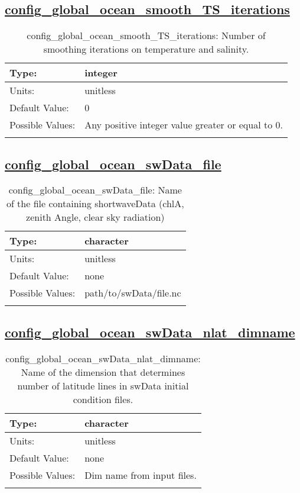 \subsection[config\_global\_ocean\_smooth\_TS\_iterations]{\hyperref[sec:nm_tab_global_ocean]{config\_global\_ocean\_smooth\_TS\_iterations}}
\label{subsec:nm_sec_config_global_ocean_smooth_TS_iterations}
\begin{center}
\begin{longtable}{| p{2.0in} || p{4.0in} |}
    \hline
    Type: & integer \\
    \hline
    Units: & \si{unitless} \\
    \hline
    Default Value: & 0 \\
    \hline
    Possible Values: & Any positive integer value greater or equal to 0. \\
    \hline
    \caption{config\_global\_ocean\_smooth\_TS\_iterations: Number of smoothing iterations on temperature and salinity.}
\end{longtable}
\end{center}
\subsection[config\_global\_ocean\_swData\_file]{\hyperref[sec:nm_tab_global_ocean]{config\_global\_ocean\_swData\_file}}
\label{subsec:nm_sec_config_global_ocean_swData_file}
\begin{center}
\begin{longtable}{| p{2.0in} || p{4.0in} |}
    \hline
    Type: & character \\
    \hline
    Units: & \si{unitless} \\
    \hline
    Default Value: & none \\
    \hline
    Possible Values: & path/to/swData/file.nc \\
    \hline
    \caption{config\_global\_ocean\_swData\_file: Name of the file containing shortwaveData (chlA, zenith Angle, clear sky radiation)}
\end{longtable}
\end{center}
\subsection[config\_global\_ocean\_swData\_nlat\_dimname]{\hyperref[sec:nm_tab_global_ocean]{config\_global\_ocean\_swData\_nlat\_dimname}}
\label{subsec:nm_sec_config_global_ocean_swData_nlat_dimname}
\begin{center}
\begin{longtable}{| p{2.0in} || p{4.0in} |}
    \hline
    Type: & character \\
    \hline
    Units: & \si{unitless} \\
    \hline
    Default Value: & none \\
    \hline
    Possible Values: & Dim name from input files. \\
    \hline
    \caption{config\_global\_ocean\_swData\_nlat\_dimname: Name of the dimension that determines number of latitude lines in swData initial condition files.}
\end{longtable}
\end{center}
